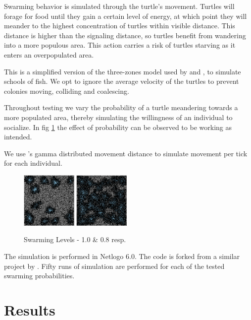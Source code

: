 \documentclass[a4paper,12pt,twocolumn]{report}
\begin{document}
Swarming behavior is simulated through the turtle's movement. Turtles will forage for food until they gain a certain level of energy, at which point they will meander to the highest concentration of turtles within visible distance. This distance is higher than the signaling distance, so turtles benefit from wandering into a more populous area. This action carries a risk of turtles starving as it enters an overpopulated area.

This is a simplified version of the three-zones model used by \cite{1982simulation} and \cite{huth1992simulation}, to simulate schools of fish. We opt to ignore the average velocity of the turtles to prevent colonies moving, colliding and coalescing.

Throughout testing we vary the probability of a turtle meandering towards a more populated area, thereby simulating the willingness of an individual to socialize. In fig \ref{fig:swarming} the effect of probability can be observed to be working as intended.

We use \cite{edwards2007revisiting}'s gamma distributed movement distance to simulate movement per tick for each individual.

\begin{figure}[t]
 \includegraphics[width=0.24\textwidth]{swarming-high}
 \includegraphics[width=0.24\textwidth]{swarming-low}
 \caption{Swarming Levels - 1.0 \& 0.8 resp.}
 \label{fig:swarming}
\end{figure}

The simulation is performed in Netlogo 6.0. The code is forked from a similar project by \cite{vcavce2007agent}. Fifty runs of simulation are performed for each of the tested swarming probabilities.

\section{Results}
\end{document}
